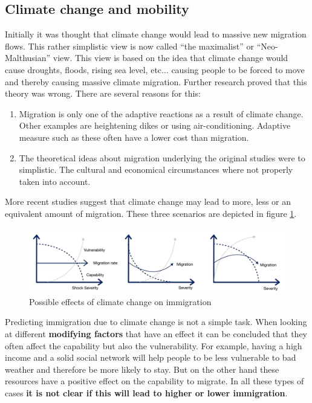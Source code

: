 \documentclass[../summary.tex]{subfiles}
\begin{document}
\subsection{Climate change and mobility}
Initially it was thought that climate change would lead to massive new migration flows. This rather simplistic view is now called ``the maximalist'' or ``Neo-Malthusian'' view. This view is based on the idea that climate change would cause droughts, floods, rising sea level, etc... causing people to be forced to move and thereby causing massive climate migration. Further research proved that this theory was wrong. There are several reasons for this:
\begin{enumerate}
	\item Migration is only one of the adaptive reactions as a result of climate change. Other examples are heightening dikes or using air-conditioning. Adaptive measure such as these often have a lower cost than migration.
	\item The theoretical ideas about migration underlying the original studies were to simplistic. The cultural and economical circumstances where not properly taken into account.
\end{enumerate}
More recent studies suggest that climate change may lead to more, less or an equivalent amount of migration. These three scenarios are depicted in figure \ref{fig:climate-change}.
\begin{figure}[h]
	\centering
	\includegraphics[width=0.7\linewidth]{../images/7-climate-change}
	\caption{Possible effects of climate change on immigration}
	\label{fig:climate-change}
\end{figure}
Predicting immigration due to climate change is not a simple task. When looking at different \textbf{modifying factors} that have an effect it can be concluded that they often affect the capability but also the vulnerability. For example, having a high income and a solid social network will help people to be less vulnerable to bad weather and therefore be more likely to stay. But on the other hand these resources have a positive effect on the capability to migrate. In all these types of cases \textbf{it is not clear if this will lead to higher or lower immigration}.
\end{document}
